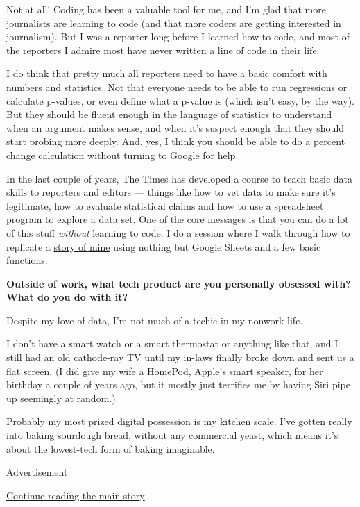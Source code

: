 Not at all! Coding has been a valuable tool for me, and I'm glad that
more journalists are learning to code (and that more coders are getting
interested in journalism). But I was a reporter long before I learned
how to code, and most of the reporters I admire most have never written
a line of code in their life.

I do think that pretty much all reporters need to have a basic comfort
with numbers and statistics. Not that everyone needs to be able to run
regressions or calculate p-values, or even define what a p-value is
(which
\href{https://fivethirtyeight.com/features/not-even-scientists-can-easily-explain-p-values/}{isn't
easy}, by the way). But they should be fluent enough in the language of
statistics to understand when an argument makes sense, and when it's
suspect enough that they should start probing more deeply. And, yes, I
think you should be able to do a percent change calculation without
turning to Google for help.

In the last couple of years, The Times has developed a course to teach
basic data skills to reporters and editors --- things like how to vet
data to make sure it's legitimate, how to evaluate statistical claims
and how to use a spreadsheet program to explore a data set. One of the
core messages is that you can do a lot of this stuff \emph{without}
learning to code. I do a session where I walk through how to replicate a
\href{https://www.nytimes3xbfgragh.onion/2017/10/24/business/economy/future-jobs.html}{story
of mine} using nothing but Google Sheets and a few basic functions.

\textbf{Outside of work, what tech product are you personally obsessed
with? What do you do with it?}

Despite my love of data, I'm not much of a techie in my nonwork life.

I don't have a smart watch or a smart thermostat or anything like that,
and I still had an old cathode-ray TV until my in-laws finally broke
down and sent us a flat screen. (I did give my wife a HomePod, Apple's
smart speaker, for her birthday a couple of years ago, but it mostly
just terrifies me by having Siri pipe up seemingly at random.)

Probably my most prized digital possession is my kitchen scale. I've
gotten really into baking sourdough bread, without any commercial yeast,
which means it's about the lowest-tech form of baking imaginable.

Advertisement

\protect\hyperlink{after-bottom}{Continue reading the main story}

